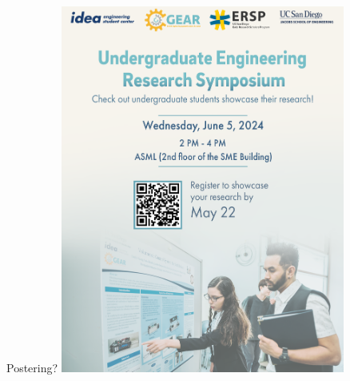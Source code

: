 \begin{frame}{Postering?}
    \centering
    \includegraphics[height=0.7\textheight,width=0.7\textwidth,keepaspectratio]{images/rtt/Research Symposium Flyer.png}
\end{frame}
